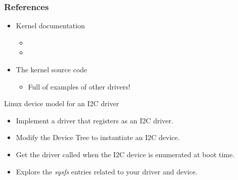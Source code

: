 \begin{frame}
  \frametitle{References}
  \begin{itemize}
  \item Kernel documentation
    \begin{itemize}
    \item {}
    \item {}
    \end{itemize}
  \item The kernel source code
    \begin{itemize}
    \item Full of examples of other drivers!
    \end{itemize}
  \end{itemize}
\end{frame}

\setuplabframe
{Linux device model for an I2C driver}
{
  \begin{itemize}
  \item Implement a driver that registers as an I2C driver.
  \item Modify the Device Tree to instantiate an I2C device.
  \item Get the driver called when the I2C device is enumerated at
    boot time.
  \item Explore the {\em sysfs} entries related to your driver and
    device.
  \end{itemize}
}
